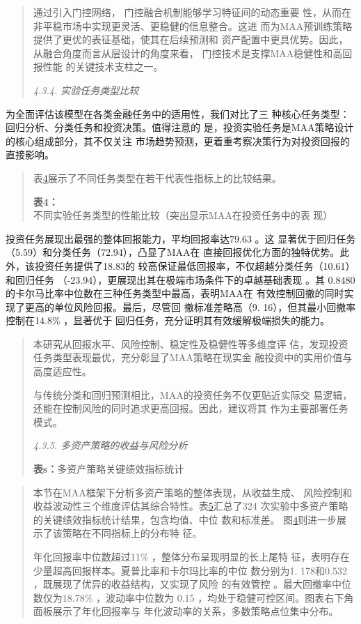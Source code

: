 \begin{quote}
通过引入门控网络， 门控融合机制能够学习特征间的动态重要
性，从而在非平稳市场中实现更灵活、更稳健的信息整合。这进
而为MAA预训练策略提供了更优的表征基础，使其在后续预测和
资产配置中更具优势。因此，从融合角度而言从层设计的角度来看，
门控技术是支撑MAA稳健性和高回报性能 的关键技术支柱之一。

\emph{4.3.4. 实验任务类型比较}
\end{quote}

为全面评估该模型在各类金融任务中的适用性，我们对比了三 种核心任务类型：
回归分析、分类任务和投资决策。值得注意的
是，投资实验任务是MAA策略设计的核心组成部分，其不仅关注
市场趋势预测，更着重考察决策行为对投资回报的直接影响。

\begin{quote}
\protect{}\label{bookmark49}{}表\hyperref[bookmark49]{4}展示了不同任务类型在若干代表性指标上的比较结果。

\textbf{表4：}不同实验任务类型的性能比较（突出显示MAA在投资任务中的表
现）
\end{quote}



投资任务展现出最强的整体回报能力，平均回报率达79.63 。这
显著优于回归任务（5.59）和分类任务（72.94），凸显了MAA在
直接回报优化方面的独特优势。此外，该投资任务提供了18.83的
较高保证最低回报率，不仅超越分类任务（10.61）和回归任务
（-23.94），更展现出其在极端市场条件下的卓越基础表现 。其
0.8480的卡尔马比率中位数在三种任务类型中最高，表明MAA在
有效控制回撤的同时实现了更高的单位风险回报。最后，尽管回
撤标准差略高（9. 16），但其最小回撤率控制在14.8\% ，显著优于
回归任务，充分证明其有效缓解极端损失的能力。

\begin{quote}
本研究从回报水平、风险控制、稳定性及稳健性等多维度评
估，发现投资任务类型表现最优，充分彰显了MAA策略在现实金
融投资中的实用价值与高度适应性。

与传统分类和回归预测相比，MAA的投资任务不仅更贴近实际交
易逻辑，还能在控制风险的同时追求更高回报。因此，建议将其
作为主要部署任务模式。

\protect{}\label{bookmark50}{}\emph{4.3.5.
多资产策略的收益与风险分析}

\textbf{表s：}多资产策略关键绩效指标统计
\end{quote}


\begin{quote}
本节在MAA框架下分析多资产策略的整体表现，从收益生成、
风险控制和收益波动性三个维度评估其综合特性。表\hyperref[bookmark50]{5}汇总了324
次实验中多资产策略的关键绩效指标统计结果，包含均值、中位 数和标准差。
图\hyperref[bookmark51]{4}则进一步展示了该策略在不同指标上的分布特 征。

年化回报率中位数超过11\% ，整体分布呈现明显的长上尾特
征，表明存在少量超高回报样本。夏普比率和卡尔玛比率的中位 数分别为1.
178和0.532 ，既展现了优异的收益结构，又实现了风险 的有效管控
。最大回撤率中位数仅为18.78\% ，波动率中位数为 0.15
，均处于稳健可控区间。图表右下角面板展示了年化回报率与
年化波动率的关系，多数策略点位集中分布。
\end{quote}

